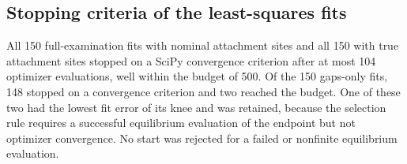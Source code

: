 \subsection*{Stopping criteria of the least-squares fits}

All 150 full-examination fits with nominal attachment sites and all 150 with true attachment sites stopped on a SciPy convergence criterion after at most 104 optimizer evaluations, well within the budget of 500.
Of the 150 gaps-only fits, 148 stopped on a convergence criterion and two reached the budget.
One of these two had the lowest fit error of its knee and was retained, because the selection rule requires a successful equilibrium evaluation of the endpoint but not optimizer convergence.
No start was rejected for a failed or nonfinite equilibrium evaluation.
